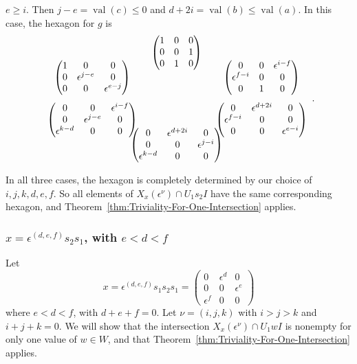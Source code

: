\documentclass{amsart}
\theoremstyle{definition}
\def\e{\epsilon}
\def\val{\mathop{\mathrm{val}}}
\def\en{\e^{\nu}}
\def\X{X_x(\en)}
\def\heximages#1#2#3#4#5#6{
  \heximagessqueezedcarefully{1.7em}{-1em}{#1}{#2}{#3}{#4}{#5}{#6}
}
\def\heximagessqueezedcarefully#1#2#3#4#5#6#7#8{
  \begin{array}{ccc}
    & #3 & \\[#2]
    #5 \hspace{-#1} & & \hspace{-#1} #4 \\[2em]
    #6 \hspace{-#1} & & \hspace{-#1} #7 \\[#2]
    & #8 &
  \end{array}
}
\newenvironment{caselist}
	       {\begin{list}{\underline{Case \arabic{enumi}}:}
		   {\usecounter{enumi}
		     \setlength{\itemindent}{0.5in}
		     \setlength{\leftmargin}{0in}
		     \setlength{\rightmargin}{0in}
	       }}
	       {\end{list}}
\begin{document}
\begin{caselist}
      \item $e \ge i$.  Then $j - e = \val(c) \le 0$ and $d + 2i = \val(b) \le
      \val(a)$.  In this case, the hexagon for $g$ is
      \begin{equation*}
	\heximages
	    {\begin{pmatrix}
		1 & 0 & 0 \\
		0 & 0 & 1 \\
		0 & 1 & 0
	    \end{pmatrix}}
	    {\begin{pmatrix}
		0 & 0 & \e^{i - f} \\
		\e^{f-i} & 0 & 0 \\
		0 & 1 & 0
	    \end{pmatrix}}
	    {\begin{pmatrix}
		1 & 0 & 0 \\
		0 & \e^{j-e} & 0\\
		0 & 0 & \e^{e-j}
	    \end{pmatrix}}
	    {\begin{pmatrix}
		0 & 0 & \e^{i-f}\\
		0 & \e^{j-e} & 0 \\
		\e^{k-d} & 0 & 0
	    \end{pmatrix}}
	    {\begin{pmatrix}
		0 & \e^{d+2i} & 0\\ 
		\e^{f-i} & 0 & 0 \\
		0 & 0 & \e^{e-i}
	    \end{pmatrix}}
	    {\begin{pmatrix}
		0 & \e^{d+2i} & 0\\ 
		0 & 0 & \e^{j-i} \\
		\e^{k-d} & 0 & 0
	    \end{pmatrix}}.
      \end{equation*}
  \end{caselist}
  In all three cases, the hexagon is completely determined by our choice of
  $i,j,k,d,e,f$.  So all elements of $\X \cap U_1 s_2 I$ have the same
  corresponding hexagon, and Theorem~\ref{thm:Triviality-For-One-Intersection}
  applies.

  \subsubsection{$x = \e^{(d, e, f)}s_2 s_1$, with $e < d < f$}
  Let
  \begin{equation}
    x = \e^{(d, e, f)}s_1 s_2 s_1 = \begin{pmatrix}
        0 & \e^d & 0 \\
        0 & 0 & \e^e  \\
        \e^f & 0 & 0
      \end{pmatrix}
  \end{equation}
  where $e < d < f$, with $d + e + f = 0$.  Let $\nu = (i, j, k)$
  with $i > j > k$ and $i + j + k = 0$.  We will show that the intersection $\X
  \cap U_1 wI$ is nonempty for only one value of $w \in W$, and that
  Theorem~\ref{thm:Triviality-For-One-Intersection} applies.
\end{document}
